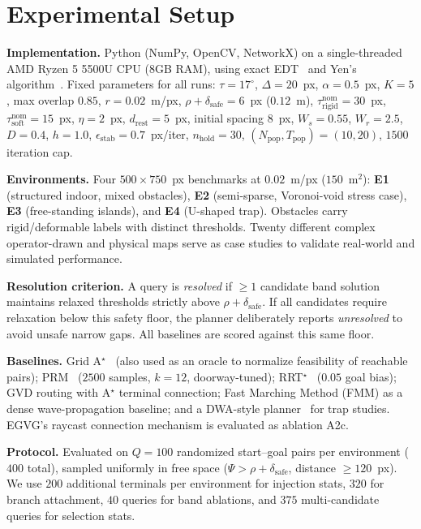 \documentclass[conference]{IEEEtran}
\begin{document}
\section{Experimental Setup}
\label{sec:setup}

\textbf{Implementation.} Python (NumPy, OpenCV, NetworkX) on a single-threaded AMD Ryzen 5 5500U CPU (8GB RAM), using exact EDT~\cite{felzenszwalb2012} and Yen's algorithm~\cite{yen1971}. Fixed parameters for all runs: $\tau=17^\circ$, $\Delta=20$~px, $\alpha=0.5$~px, $K=5$, max overlap $0.85$, $r=0.02$~m/px, $\rho+\delta_{\mathrm{safe}}=6$~px ($0.12$~m), $\tau^{\mathrm{nom}}_{\mathrm{rigid}}=30$~px, $\tau^{\mathrm{nom}}_{\mathrm{soft}}=15$~px, $\eta=2$~px, $d_{\mathrm{rest}}=5$~px, initial spacing $8$~px, $W_s=0.55$, $W_r=2.5$, $D=0.4$, $h=1.0$, $\epsilon_{\mathrm{stab}}=0.7$~px/iter, $n_{\mathrm{hold}}=30$, $(N_{\mathrm{pop}},T_{\mathrm{pop}})=(10,20)$, $1500$ iteration cap.

\textbf{Environments.} Four $500\times750$~px benchmarks at $0.02$~m/px ($150$~m$^2$): \textbf{E1} (structured indoor, mixed obstacles), \textbf{E2} (semi-sparse, Voronoi-void stress case), \textbf{E3} (free-standing islands), and \textbf{E4} (U-shaped trap). Obstacles carry rigid/deformable labels with distinct thresholds. Twenty different complex operator-drawn and physical maps serve as case studies to validate real-world and simulated performance.

\textbf{Resolution criterion.} A query is \emph{resolved} if $\ge 1$ candidate band solution maintains relaxed thresholds strictly above $\rho+\delta_{\mathrm{safe}}$. If all candidates require relaxation below this safety floor, the planner deliberately reports \emph{unresolved} to avoid unsafe narrow gaps. All baselines are scored against this same floor.

\textbf{Baselines.} Grid A$^\star$~\cite{hart1968} (also used as an oracle to normalize feasibility of reachable pairs); PRM~\cite{kavraki1996} ($2500$ samples, $k=12$, doorway-tuned); RRT$^\star$~\cite{karaman2011} ($0.05$ goal bias); GVD routing with A$^\star$ terminal connection; Fast Marching Method (FMM) as a dense wave-propagation baseline; and a DWA-style planner~\cite{fox1997} for trap studies. EGVG's raycast connection mechanism is evaluated as ablation A2c.

\textbf{Protocol.} Evaluated on $Q=100$ randomized start--goal pairs per environment ($400$ total), sampled uniformly in free space ($\Psi>\rho+\delta_{\mathrm{safe}}$, distance $\ge 120$~px). We use $200$ additional terminals per environment for injection stats, $320$ for branch attachment, $40$ queries for band ablations, and $375$ multi-candidate queries for selection stats.
\end{document}
